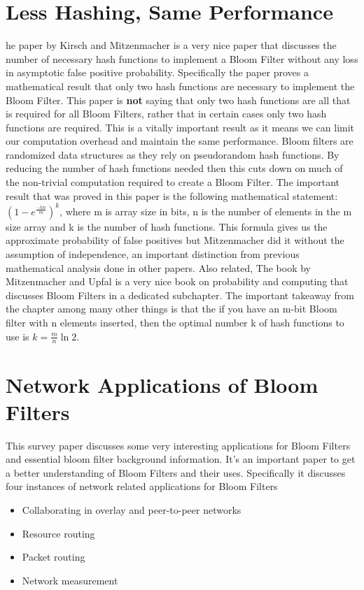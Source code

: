 \documentclass[MScCS]{uccthesis}
\begin{document}
\section{Less Hashing, Same Performance}
he paper by  Kirsch and Mitzenmacher \cite{kirsch2006less} is a very nice paper that discusses the number of necessary hash functions to implement a Bloom Filter without any loss in asymptotic false positive probability. Specifically the paper proves a mathematical result that only two hash functions are necessary to implement the Bloom Filter. This paper is \textbf{not} saying that only two hash functions are all that is required for all Bloom Filters, rather that in certain cases only two hash functions are required. This is a vitally important result as it means we can limit our computation overhead and maintain the same performance. Bloom filters are randomized data structures as they rely on pseudorandom hash functions. By reducing the number of hash functions needed then this cuts down on much of the non-trivial computation required to create a Bloom Filter. The important result that was proved in this paper is the following mathematical statement: $(1-e^\frac{-kn}{m})^k$, where m is array size in bits, n is the number of elements in the m size array and k is the number of hash functions. This formula gives us the approximate probability of false positives but Mitzenmacher did it without the assumption of independence, an important distinction from previous mathematical analysis done in other papers. Also related, The book by Mitzenmacher and Upfal \cite{mitzenmacher2017probability} is a very nice book on probability and computing that discusses Bloom Filters in a dedicated subchapter. The important takeaway from the chapter among many other things is that the if you have an m-bit Bloom filter with n elements inserted, then the optimal number k of hash functions to use is $k = \frac{m}{n}\ln 2$.

\section{Network Applications of Bloom Filters}
This survey paper\cite{broder2004network} discusses some very interesting applications for Bloom Filters and essential bloom filter background information. It's an important paper to get a better understanding of Bloom Filters and their uses. Specifically it discusses four instances of network related applications for Bloom Filters
\begin{itemize}
    \item Collaborating in overlay and peer-to-peer networks
    \item Resource routing
    \item Packet routing
    \item Network measurement
\end{itemize}
\end{document}
